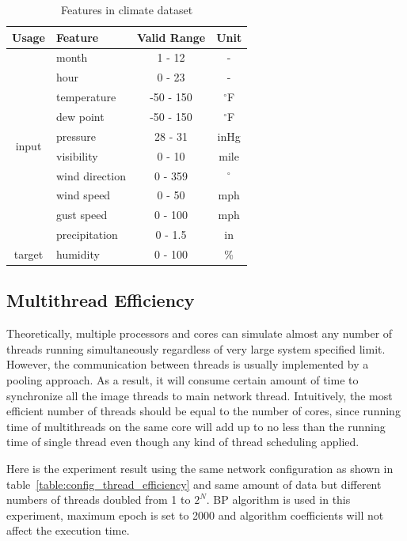 \documentclass[procedia]{easychair}
\begin{document}
\begin{table}[htp]
    \centering
    \caption{Features in climate dataset}
    \begin{tabular}{ c l c c }
        \hline \hline
        Usage & Feature & Valid Range & Unit \\
        \hline
        \multirow{10}{*}{input}
            & month & 1 - 12 & - \\
            & hour & 0 - 23 & - \\
            & temperature & -50 - 150 & \(^\circ\)F \\
            & dew point & -50 - 150 & \(^\circ\)F \\
            & pressure & 28 - 31 & inHg \\
            & visibility & 0 - 10 & mile \\
            & wind direction & 0 - 359 & \(^\circ\) \\
            & wind speed & 0 - 50 & mph \\
            & gust speed & 0 - 100 & mph \\
            & precipitation & 0 - 1.5 & in \\
        \hline
        target & humidity & 0 - 100 & \% \\
        \hline \hline
    \end{tabular}
    \label{table:climate}
\end{table}

\subsection{Multithread Efficiency}

Theoretically, multiple processors and cores can simulate almost any number of threads running simultaneously regardless of very large system specified limit.  However, the communication between threads is usually implemented by a pooling approach.  As a result, it will consume certain amount of time to synchronize all the image threads to main network thread.  Intuitively, the most efficient number of threads should be equal to the number of cores, since running time of multithreads on the same core will add up to no less than the running time of single thread even though any kind of thread scheduling applied.

Here is the experiment result using the same network configuration as shown in table~\ref{table:config_thread_efficiency} and same amount of data but different numbers of threads doubled from 1 to $2 ^ N$.  BP algorithm is used in this experiment, maximum epoch is set to 2000 and algorithm coefficients will not affect the execution time.
\end{document}
